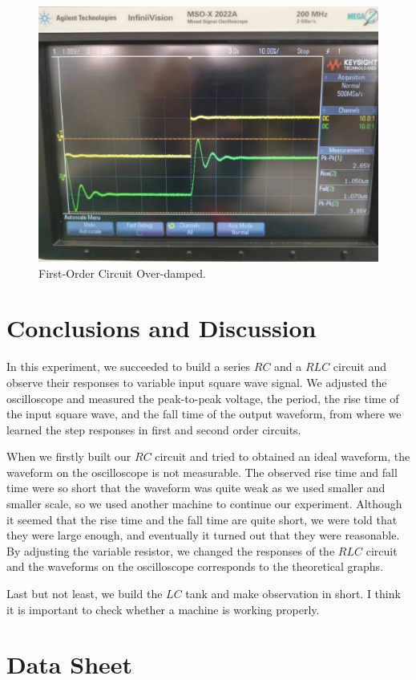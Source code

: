 \documentclass[a4paper]{report}
\begin{document}
	\begin{figure}[H]
		\centering
		\includegraphics[width=0.8\linewidth]{6.jpg}
		\caption{First-Order Circuit Over-damped.}
	\end{figure}
	\section{Conclusions and Discussion}
	In this experiment, we succeeded to build a series $RC$ and a $RLC$ circuit and observe their responses to variable input square wave signal. We adjusted the oscilloscope and measured the peak-to-peak voltage, the period, the rise time of the input square wave, and the fall time of the output waveform, from where we learned the step responses in first and second order circuits.
	
	When we firstly built our $RC$ circuit and tried to obtained an ideal waveform, the waveform on the oscilloscope is not measurable. The observed rise time and fall time were so short that the waveform was quite weak as we used smaller and smaller scale, so we used another machine to continue our experiment. Although it seemed that the rise time and the fall time are quite short, we were told that they were large enough, and eventually it turned out that they were reasonable. By adjusting the variable resistor, we changed the responses of the $RLC$ circuit and the waveforms on the oscilloscope corresponds to the theoretical graphs.
	
	Last but not least, we build the $LC$ tank and make observation in short. I think it is important to check whether a machine is working properly.
	\vspace{3cm}
	\section*{Data Sheet}
\end{document}
